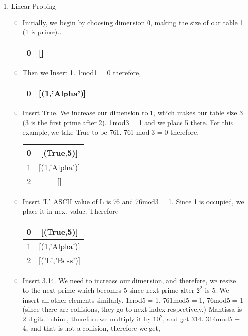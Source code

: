\documentclass{article}
\begin{document}
\begin{enumerate}
\begin{itemize}
\begin{center}
		\end{center}
	\end{itemize}
	\item Linear Probing
			\begin{itemize}
				\item Initially, we begin by choosing dimension 0, making the size of our table 1 (1 is prime).:
				\begin{center}
					\begin{tabular}{ |c|c| } 
						\hline
						0 &  [] \\ 
						\hline
					\end{tabular}
				\end{center}
				\item Then we Insert 1. 1mod1 = 0 therefore,
				\begin{center}
					\begin{tabular}{ |c|c| } 
						\hline
						0 & [(1,'Alpha')]  \\ 
						\hline
					\end{tabular}
				\end{center}
				\item Insert True. We increase our dimension to 1, which makes our table size 3 (3 is the first prime after 2). 1mod3 = 1 and we place 5 there. For this example, we take True to be 761. 761 mod 3 = 0 therefore,
				\begin{center}
					\begin{tabular}{ |c|c| } 
						\hline
						0 & [(True,5)]   \\ 
						\hline
						1 &	[(1,'Alpha')] \\
						\hline 
						2 &  [] \\ 
						\hline
					\end{tabular}
				\end{center}
				\item Insert 'L'. ASCII value of L is 76 and 76mod3 = 1. Since 1 is occupied, we place it in next value. Therefore
				\begin{center}
					\begin{tabular}{ |c|c| } 
						\hline
						0 & [(True,5)]   \\ 
						\hline
						1 &	[(1,'Alpha')] \\
						\hline 
						2 &  [('L','Boss')] \\ 
						\hline
					\end{tabular}
				\end{center}
				\item  Insert 3.14. We need to increase our dimension, and therefore, we resize to the next prime which becomes 5 since next prime after $2^2$ is 5. We insert all other elements similarly. 1mod5 = 1, 761mod5 = 1, 76mod5 = 1 (since there are collisions, they go to next index respectively.)  Mantissa is 2 digits behind, therefore we multiply it by $10^2$, and get 314. 314mod5 = 4, and that is not a collision, therefore we get,

\end{itemize}
\end{enumerate}
\end{document}
